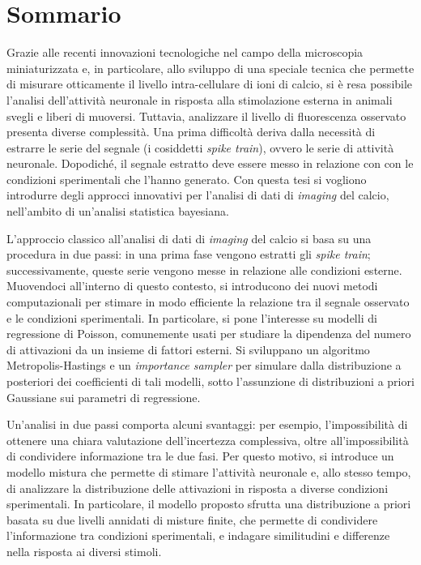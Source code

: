 \chapter*{Sommario} 
Grazie alle recenti innovazioni tecnologiche nel campo della microscopia miniaturizzata e, in particolare, allo sviluppo di una speciale tecnica che permette di misurare otticamente il livello intra-cellulare di ioni di calcio, si è resa possibile l'analisi dell'attività neuronale in risposta alla stimolazione esterna in animali svegli e liberi di muoversi.
Tuttavia, analizzare il livello di fluorescenza osservato presenta diverse complessità. Una prima difficoltà deriva dalla necessità di estrarre le serie del segnale (i cosiddetti \textit{spike train}), ovvero le serie di attività neuronale. Dopodiché, il segnale estratto deve essere messo in relazione con con le condizioni sperimentali che l'hanno generato. Con questa tesi si vogliono introdurre degli approcci innovativi per l'analisi di dati di \textit{imaging} del calcio, nell'ambito di un'analisi statistica bayesiana.

L'approccio classico all'analisi di dati di \textit{imaging} del calcio si basa su una procedura in due passi: in una prima fase vengono estratti gli \textit{spike train}; successivamente, queste serie vengono messe in relazione alle condizioni esterne. Muovendoci all'interno di questo contesto, si introducono dei nuovi metodi computazionali per stimare in modo efficiente la relazione tra il segnale osservato e le condizioni sperimentali. In particolare, si pone l'interesse su modelli di regressione di Poisson, comunemente usati per studiare la dipendenza del numero di attivazioni da un insieme di fattori esterni. Si sviluppano un algoritmo Metropolis-Hastings e un \textit{importance sampler} per simulare dalla distribuzione a posteriori dei coefficienti di tali modelli, sotto l'assunzione di distribuzioni a priori Gaussiane sui parametri di regressione.

Un'analisi in due passi comporta alcuni svantaggi: per esempio, l'impossibilità di ottenere una chiara valutazione dell'incertezza complessiva, oltre all'impossibilità di condividere informazione tra le due fasi. Per questo motivo, si introduce un modello mistura che permette di stimare l'attività neuronale e, allo stesso tempo, di analizzare la distribuzione delle attivazioni in risposta a diverse condizioni sperimentali. In particolare, il modello proposto sfrutta una distribuzione a priori basata su due livelli annidati di misture finite, che permette di condividere l'informazione tra condizioni sperimentali, e indagare similitudini e differenze nella risposta ai diversi stimoli.

